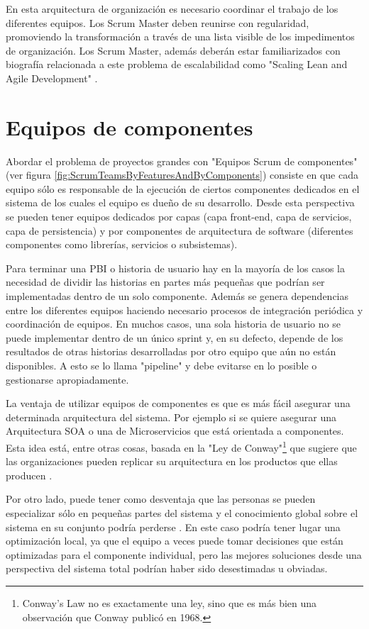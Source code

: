 En esta arquitectura de organización es necesario coordinar el trabajo de los diferentes equipos. Los Scrum Master deben reunirse con regularidad, promoviendo la transformación a través de una lista visible de los impedimentos de organización. Los Scrum Master, además deberán estar familiarizados con biografía relacionada a este problema de escalabilidad como "Scaling Lean and Agile Development" \cite{Larman-Vodde-2008}.

\section{Equipos de componentes}

Abordar el problema de proyectos grandes con "Equipos Scrum de componentes" (ver figura \ref{fig:ScrumTeamsByFeaturesAndByComponents}) consiste en que cada equipo sólo es responsable de la ejecución de ciertos componentes dedicados en el sistema de los cuales el equipo es dueño de su desarrollo. Desde esta perspectiva se pueden tener equipos dedicados por capas (capa front-end, capa de servicios, capa de persistencia) y por componentes de arquitectura de software (diferentes componentes como librerías, servicios o subsistemas).

Para terminar una PBI o historia de usuario hay en la mayoría de los casos la necesidad de dividir las historias en partes más pequeñas que podrían ser implementadas dentro de un solo componente. Además se genera dependencias entre los diferentes equipos haciendo necesario procesos de integración periódica y coordinación de equipos. En muchos casos, una sola historia de usuario no se puede implementar dentro de un único sprint y, en su defecto, depende de los resultados de otras historias desarrolladas por otro equipo que aún no están disponibles. A esto se lo llama "pipeline" y debe evitarse en lo posible o gestionarse apropiadamente.

La ventaja de utilizar equipos de componentes es que es más fácil asegurar una determinada arquitectura del sistema. Por ejemplo si se quiere asegurar una Arquitectura SOA o una de Microservicios que está orientada a componentes. Esta idea está, entre otras cosas, basada en la "Ley de Conway"\footnote{Conway's Law \cite{Conway-1968} no es exactamente una ley, sino que es más bien una observación que Conway publicó en 1968.} que sugiere que las organizaciones pueden replicar su arquitectura en los productos que ellas producen \cite{Martin-Fowler-2014}. 

Por otro lado, puede tener como desventaja que las personas se pueden especializar sólo en pequeñas partes del sistema y el conocimiento global sobre el sistema en su conjunto podría perderse \cite{Scrum-Institute-2015}. En este caso podría tener lugar una optimización local, ya que el equipo a veces puede tomar decisiones que están optimizadas para el componente individual, pero las mejores soluciones desde una perspectiva del sistema total podrían haber sido desestimadas u obviadas.

